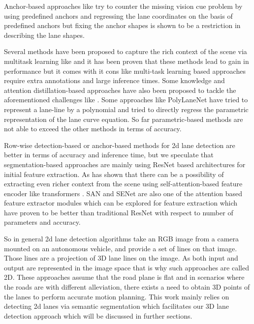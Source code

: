  Anchor-based approaches like  \cite{https://doi.org/10.48550/arxiv.2010.12035} try to counter the missing vision cue problem by using predefined anchors and regressing the lane coordinates on the basis of predefined anchors but fixing the anchor shapes is shown to be a restriction in describing the lane shapes.

Several methods have been proposed to capture the rich context of the scene via multitask learning like \cite{inbook} and it has been proven that these methods lead to gain in performance but it comes with it cons like multi-task learning based approaches require extra annotations and large inference times. Some knowledge and attention distillation-based approaches have also been proposed to tackle the aforementioned challenges like \cite{DBLP:journals/corr/abs-1908-00821}. Some approaches like PolyLaneNet\cite{DBLP:journals/corr/abs-2004-10924} have tried to represent a lane-line by a polynomial and tried to directly regress the parametric representation of the lane curve equation. So far parametric-based methods are not able to exceed the other methods in terms of accuracy.

Row-wise detection-based or anchor-based methods for 2d lane detection are better in terms of accuracy and inference time, but we speculate that segmentation-based approaches are mainly using ResNet\cite{DBLP:journals/corr/HeZRS15} based architectures for initial feature extraction. As \cite{DBLP:journals/corr/abs-2105-05003} has shown that there can be a possibility of extracting even richer context from the scene using self-attention-based feature encoder like transformers \cite{https://doi.org/10.48550/arxiv.1706.03762}.   SAN\cite{DBLP:journals/corr/abs-2004-13621} and SENet\cite{DBLP:journals/corr/abs-1709-01507} are also one of the attention based feature extractor modules which can be explored for feature extraction which have proven to be better than traditional ResNet\cite{DBLP:journals/corr/HeZRS15} with respect to number of parameters and accuracy. 

So in general 2d lane detection algorithms take an RGB image from a camera mounted on an autonomous vehicle, and provide a set of lines on that image. Those lines are a projection of 3D lane lines on the image. As both input and output are represented in the image space that is why such approaches are called 2D. These approaches assume that the road plane is flat and in scenarios where the roads are with different alleviation, there exists a need to obtain 3D points of the lanes to perform accurate motion planning. This work mainly relies on detecting 2d lanes via semantic segmentation which facilitates our 3D lane detection approach which will be discussed in further sections. 
        
